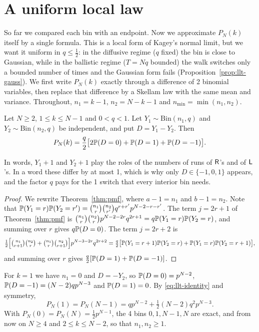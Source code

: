 \section{A uniform local law}\label{sec:llt}

So far we compared each bin with an endpoint. Now we approximate $P_N(k)$
itself by a single formula. This is a local form of Kagey's normal limit, but
we want it uniform in $q\le\frac12$: in the diffusive regime ($q$ fixed) the
bin is close to Gaussian, while in the ballistic regime ($T=Nq$ bounded) the
walk switches only a bounded number of times and the Gaussian form fails
(Proposition~\ref{prop:llt-gauss}). We first write $P_N(k)$ exactly through a
difference of 2 binomial variables, then replace that difference by a Skellam
law with the same mean and variance. Throughout, $n_1=k-1$, $n_2=N-k-1$ and
$n_{\min}=\min(n_1,n_2)$.

\begin{theorem}\label{thm:llt-identity}
Let $N\ge2$, $1\le k\le N-1$ and $0<q<1$. Let $Y_1\sim\mathrm{Bin}(n_1,q)$ and
$Y_2\sim\mathrm{Bin}(n_2,q)$ be independent, and put $D=Y_1-Y_2$. Then
\begin{equation}\label{eq:llt-identity}
P_N(k)=\frac q2\bigl[2\mathbb{P}(D=0)+\mathbb{P}(D=1)+\mathbb{P}(D=-1)\bigr].
\end{equation}
\end{theorem}

In words, $Y_1+1$ and $Y_2+1$ play the roles of the numbers of runs of
$\mathsf R$'s and of $\mathsf L$'s. In a word these differ by at most 1, which is why only
$D\in\{-1,0,1\}$ appears, and the factor $q$ pays for the 1 switch that every
interior bin needs.

\begin{proof}
We rewrite Theorem~\ref{thm:pmf}, where $a-1=n_1$ and $b-1=n_2$. Note that
$\mathbb{P}(Y_1=r)\mathbb{P}(Y_2=r')=\binom{n_1}r\binom{n_2}{r'}q^{r+r'}p^{N-2-r-r'}$.
The term $j=2r+1$ of Theorem~\ref{thm:pmf} is
$\binom{n_1}r\binom{n_2}rp^{N-2-2r}q^{2r+1}=q\mathbb{P}(Y_1=r)\mathbb{P}(Y_2=r)$, and
summing over $r$ gives $q\mathbb{P}(D=0)$. The term $j=2r+2$ is
\[
\tfrac12\Bigl[\tbinom{n_1}{r+1}\tbinom{n_2}r+\tbinom{n_1}r\tbinom{n_2}{r+1}\Bigr]p^{N-3-2r}q^{2r+2}
=\tfrac q2\bigl[\mathbb{P}(Y_1=r+1)\mathbb{P}(Y_2=r)+\mathbb{P}(Y_1=r)\mathbb{P}(Y_2=r+1)\bigr],
\]
and summing over $r$ gives $\frac q2[\mathbb{P}(D=1)+\mathbb{P}(D=-1)]$.
\end{proof}

For $k=1$ we have $n_1=0$ and $D=-Y_2$, so $\mathbb{P}(D=0)=p^{N-2}$,
$\mathbb{P}(D=-1)=(N-2)qp^{N-3}$ and $\mathbb{P}(D=1)=0$. By \eqref{eq:llt-identity} and
symmetry,
\begin{equation}\label{eq:llt-edge}
P_N(1)=P_N(N-1)=qp^{N-2}+\tfrac12(N-2)q^2p^{N-3}.
\end{equation}
With $P_N(0)=P_N(N)=\frac12p^{N-1}$, the 4 bins $0,1,N-1,N$ are exact, and from
now on $N\ge4$ and $2\le k\le N-2$, so that $n_1,n_2\ge1$.

